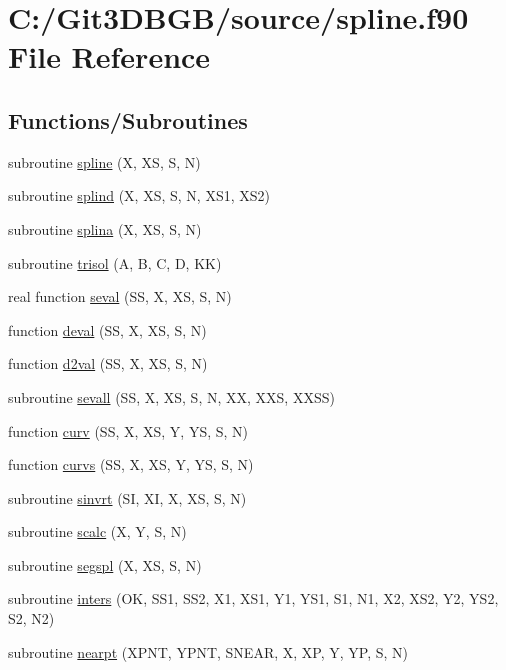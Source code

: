 \hypertarget{spline_8f90}{}\section{C\+:/\+Git3\+D\+B\+G\+B/source/spline.f90 File Reference}
\label{spline_8f90}
\subsection*{Functions/\+Subroutines}
\begin{DoxyCompactItemize}
\item 
subroutine \hyperlink{spline_8f90_a355599e71d0cfc3b5acbc54366521bb5}{spline} (X, X\+S, S, N)
\item 
subroutine \hyperlink{spline_8f90_aa9246de3e5773632eb620cc4d151964b}{splind} (X, X\+S, S, N, X\+S1, X\+S2)
\item 
subroutine \hyperlink{spline_8f90_a3c878fa6b2e53140633297940a98e8bc}{splina} (X, X\+S, S, N)
\item 
subroutine \hyperlink{spline_8f90_ae6a1dfc9c3debfa756430e1f779a3f95}{trisol} (A, B, C, D, K\+K)
\item 
real function \hyperlink{spline_8f90_ad1042233290c73d457f8ebb490d6cfb0}{seval} (S\+S, X, X\+S, S, N)
\item 
function \hyperlink{spline_8f90_abe45afb5f9ac2c9238b4b954ba21b75a}{deval} (S\+S, X, X\+S, S, N)
\item 
function \hyperlink{spline_8f90_a5554fa6486b695b7921933d72170f37b}{d2val} (S\+S, X, X\+S, S, N)
\item 
subroutine \hyperlink{spline_8f90_ae12b49d0c3950a8711e046df6dfc7ff5}{sevall} (S\+S, X, X\+S, S, N, X\+X, X\+X\+S, X\+X\+S\+S)
\item 
function \hyperlink{spline_8f90_a8c85076bce8a99e3edcf74aad65acbd0}{curv} (S\+S, X, X\+S, Y, Y\+S, S, N)
\item 
function \hyperlink{spline_8f90_a56f5e2c4c8309d8b7f32a3f2dd551bb0}{curvs} (S\+S, X, X\+S, Y, Y\+S, S, N)
\item 
subroutine \hyperlink{spline_8f90_ab5b0cf1547429c4a8ff7016b8e1f991c}{sinvrt} (S\+I, X\+I, X, X\+S, S, N)
\item 
subroutine \hyperlink{spline_8f90_a66314c0d654eff147600d9151fe6ad43}{scalc} (X, Y, S, N)
\item 
subroutine \hyperlink{spline_8f90_a63ebe6afdb0157131dc4617fc9b2d088}{segspl} (X, X\+S, S, N)
\item 
subroutine \hyperlink{spline_8f90_a9e862d53dcbdd58741d7c380a0503599}{inters} (O\+K, S\+S1, S\+S2, X1, X\+S1, Y1, Y\+S1, S1, N1, X2, X\+S2, Y2, Y\+S2, S2, N2)
\item 
subroutine \hyperlink{spline_8f90_a5367b509bcdf701e32b30ac97f2f751a}{nearpt} (X\+P\+N\+T, Y\+P\+N\+T, S\+N\+E\+A\+R, X, X\+P, Y, Y\+P, S, N)
\end{DoxyCompactItemize}


